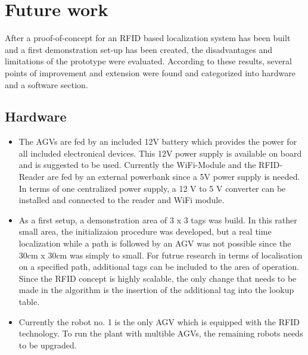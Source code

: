 \section{Future work}\label{Sec_fut}
After a proof-of-concept for an RFID based localization system has been built and a first demonstration set-up has been created, the disadvantages and limitations of the prototype were evaluated. According to these results, several points of improvement and extension were found and categorized into  hardware and a software section. 
\subsection{Hardware}
\begin{itemize}
\item The AGVs are fed by an included 12V battery which provides the power for all included electronical devices. This 12V power supply is available on board and is suggested to be used. Currently the WiFi-Module and the RFID-Reader are fed by an external powerbank since a 5V power supply is needed. In terms of one centralized power supply, a 12 V to 5 V converter can be installed and connected to the reader and WiFi module.
\item As a first setup, a demonstration area of 3 x 3 tags was build. In this rather small area, the initializaion procedure was developed, but a real time localization while a path is followed by an AGV was not possible since the 30cm x 30cm was simply to small. For futrue research in terms of localisation on a specified path, additional tags can be included to the area of operation. Since the RFID concept is highly scalable, the only change that needs to be made in the algorithm is the insertion of the additional tag into the lookup table.
\item Currently the robot no. 1 is the only AGV which is equipped with the RFID technology. To run the plant with multible AGVs, the remaining robots needs to be upgraded.\\
\end{itemize}
